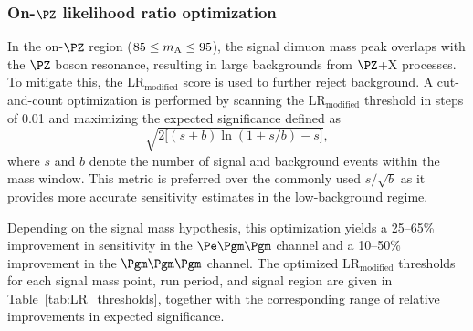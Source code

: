 \subsubsection{On-$\PZ$ likelihood ratio optimization}

In the on-$\PZ$ region ($85 \le m_{\text{A}} \le 95$\GeV), the signal dimuon mass peak overlaps with the $\PZ$ boson resonance, resulting in large backgrounds from $\PZ$+X processes. To mitigate this, the $\text{LR}_{\text{modified}}$ score is used to further reject background. A cut-and-count optimization is performed by scanning the $\text{LR}_{\text{modified}}$ threshold in steps of 0.01 and maximizing the expected significance defined as
\begin{equation}
  \sqrt{2\bigl[(s+b)\ln(1+s/b) - s\bigr]},
  \label{eq:expected_significance}
\end{equation}
where $s$ and $b$ denote the number of signal and background events within the mass window. This metric is preferred over the commonly used $s/\sqrt{b}$ as it provides more accurate sensitivity estimates in the low-background regime.

Depending on the signal mass hypothesis, this optimization yields a 25--65\% improvement in sensitivity in the $\Pe\Pgm\Pgm$ channel and a 10--50\% improvement in the $\Pgm\Pgm\Pgm$ channel. The optimized $\text{LR}_{\text{modified}}$ thresholds for each signal mass point, run period, and signal region are given in Table~\ref{tab:LR_thresholds}, together with the corresponding range of relative improvements in expected significance.

